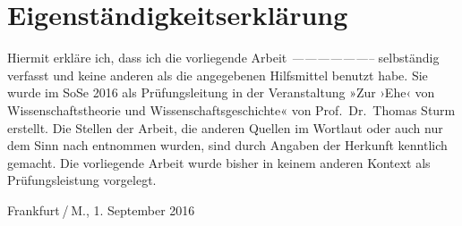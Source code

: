 \endgroup
\newpage

\section*{Eigenständigkeitserklärung}\label{eigenstuxe4ndigkeitserkluxe4rung}

Hiermit erkläre ich, dass ich die vorliegende Arbeit
\emph{--------------------} selbständig verfasst und keine anderen als
die angegebenen Hilfsmittel benutzt habe. Sie wurde im SoSe 2016 als
Prüfungsleitung in der Veranstaltung »Zur ›Ehe‹ von Wissenschaftstheorie
und Wissenschaftsgeschichte« von Prof.~Dr.~Thomas Sturm erstellt. Die
Stellen der Arbeit, die anderen Quellen im Wortlaut oder auch nur dem
Sinn nach entnommen wurden, sind durch Angaben der Herkunft kenntlich
gemacht. Die vorliegende Arbeit wurde bisher in keinem anderen Kontext
als Prüfungsleistung vorgelegt. \vspace{3em}

\noindent Frankfurt / M., 1. September 2016

